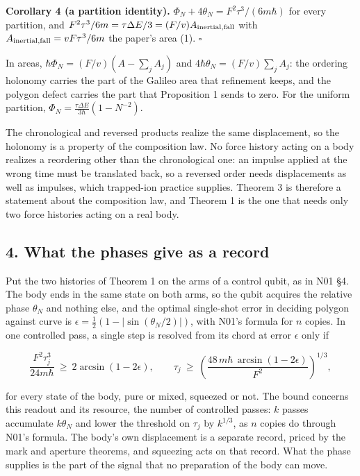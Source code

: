 \documentclass[11pt,a4paper]{article}
\begin{document}
\textbf{Corollary 4 (a partition identity).}
\(\Phi_N+4\theta_N=F^2\tau^3/(6m\hbar)\) for every partition, and
\(F^2\tau^3/6m=\tau\Delta E/3=(F/v)A_{\rm inertial,fall}\) with
\(A_{\rm inertial,fall}=vF\tau^3/6m\) the paper's area (1). \(\square\)

In areas, \(\hbar\Phi_N=(F/v)(A-\sum_jA_j)\) and
\(4\hbar\theta_N=(F/v)\sum_jA_j\): the ordering holonomy carries the
part of the Galileo area that refinement keeps, and the polygon defect
carries the part that Proposition 1 sends to zero. For the uniform
partition, \(\Phi_N=\frac{\tau\Delta E}{3\hbar}(1-N^{-2})\).

The chronological and reversed products realize the same displacement,
so the holonomy is a property of the composition law. No force history
acting on a body realizes a reordering other than the chronological one:
an impulse applied at the wrong time must be translated back, so a
reversed order needs displacements as well as impulses, which
trapped-ion practice supplies. Theorem 3 is therefore a statement about
the composition law, and Theorem 1 is the one that needs only two force
histories acting on a real body.

\hypertarget{what-the-phases-give-as-a-record}{%
\subsection{4. What the phases give as a
record}\label{what-the-phases-give-as-a-record}}

Put the two histories of Theorem 1 on the arms of a control qubit, as in
N01 §4. The body ends in the same state on both arms, so the qubit
acquires the relative phase \(\theta_N\) and nothing else, and the
optimal single-shot error in deciding polygon against curve is
\(\epsilon=\frac12(1-|\sin(\theta_N/2)|)\), with N01's formula for \(n\)
copies. In one controlled pass, a single step is resolved from its chord
at error \(\epsilon\) only if

\[\frac{F^2\tau_j^3}{24m\hbar}\ \ge\ 2\arcsin(1-2\epsilon),\qquad
\tau_j\ \ge\ \left(\frac{48\,m\hbar\,\arcsin(1-2\epsilon)}{F^2}\right)^{1/3},\]

for every state of the body, pure or mixed, squeezed or not. The bound
concerns this readout and its resource, the number of controlled passes:
\(k\) passes accumulate \(k\theta_N\) and lower the threshold on
\(\tau_j\) by \(k^{1/3}\), as \(n\) copies do through N01's formula. The
body's own displacement is a separate record, priced by the mark and
aperture theorems, and squeezing acts on that record. What the phase
supplies is the part of the signal that no preparation of the body can
move.
\end{document}

